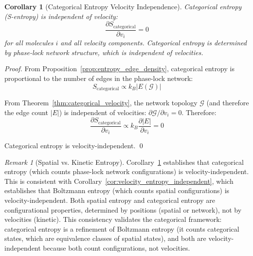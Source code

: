 \documentclass[12pt,a4paper]{article}
\newtheorem{corollary}[theorem]{Corollary}
\theoremstyle{definition}
\theoremstyle{remark}
\newtheorem{remark}[theorem]{Remark}
\newcommand{\phaselockgraph}{\mathcal{G}}
\begin{document}
\begin{corollary}[Categorical Entropy Velocity Independence]
\label{cor:categorical_entropy_velocity}
Categorical entropy (S-entropy) is independent of velocity:
\begin{equation}
\frac{\partial S_{\text{categorical}}}{\partial v_i} = 0
\label{eq:s_entropy_velocity_independent}
\end{equation}
for all molecules $i$ and all velocity components. Categorical entropy is determined by phase-lock network structure, which is independent of velocities.
\end{corollary}

\begin{proof}
From Proposition~\ref{prop:entropy_edge_density}, categorical entropy is proportional to the number of edges in the phase-lock network:
\begin{equation}
S_{\text{categorical}} \propto k_B |E(\phaselockgraph)|
\end{equation}

From Theorem~\ref{thm:categorical_velocity}, the network topology $\phaselockgraph$ (and therefore the edge count $|E|$) is independent of velocities: $\partial \phaselockgraph / \partial v_i = 0$. Therefore:
\begin{equation}
\frac{\partial S_{\text{categorical}}}{\partial v_i} \propto k_B \frac{\partial |E|}{\partial v_i} = 0
\end{equation}

Categorical entropy is velocity-independent. \qed
\end{proof}

\begin{remark}[Spatial vs. Kinetic Entropy]
\label{rem:spatial_kinetic_entropy}
Corollary~\ref{cor:categorical_entropy_velocity} establishes that categorical entropy (which counts phase-lock network configurations) is velocity-independent. This is consistent with Corollary~\ref{cor:velocity_entropy_independent}, which establishes that Boltzmann entropy (which counts spatial configurations) is velocity-independent. Both spatial entropy and categorical entropy are configurational properties, determined by positions (spatial or network), not by velocities (kinetic). This consistency validates the categorical framework: categorical entropy is a refinement of Boltzmann entropy (it counts categorical states, which are equivalence classes of spatial states), and both are velocity-independent because both count configurations, not velocities.
\end{remark}
\end{document}
